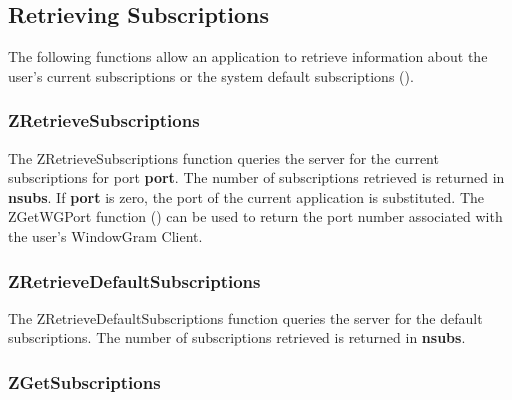 %
\subsection{Retrieving Subscriptions}
\label{retrieving-subscriptions}

The following functions allow an application to retrieve information
about the user's current subscriptions or the system default
subscriptions ().

\subsubsection{ZRetrieveSubscriptions}
\label{ZRetrieveSubscriptions}

\etemplate
{}

The ZRetrieveSubscriptions function queries the server for the current
subscriptions for port {\bf port}.  The number of subscriptions
retrieved is returned in {\bf *nsubs}.  If {\bf port} is zero, the
port of the current application is substituted.  The ZGetWGPort
function () can be used to return the port number
associated with the user's WindowGram Client.

\subsubsection{ZRetrieveDefaultSubscriptions}
\label{ZRetrieveDefaultSubscriptions}

\etemplate
{}

The ZRetrieveDefaultSubscriptions function queries the server for the
default subscriptions.  The number of subscriptions retrieved is
returned in {\bf *nsubs}.

\subsubsection{ZGetSubscriptions}
\label{ZGetSubscriptions}

